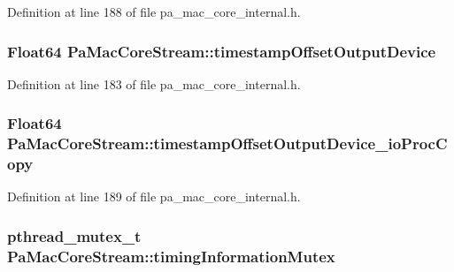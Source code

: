 Definition at line 188 of file pa\+\_\+mac\+\_\+core\+\_\+internal.\+h.

\subsubsection[{\texorpdfstring{timestamp\+Offset\+Output\+Device}{timestampOffsetOutputDevice}}]{\setlength{\rightskip}{0pt plus 5cm}Float64 Pa\+Mac\+Core\+Stream\+::timestamp\+Offset\+Output\+Device}\hypertarget{struct_pa_mac_core_stream_a81525a1ff3c1cb96a57d44c5ca70f7c4}{}\label{struct_pa_mac_core_stream_a81525a1ff3c1cb96a57d44c5ca70f7c4}


Definition at line 183 of file pa\+\_\+mac\+\_\+core\+\_\+internal.\+h.

\subsubsection[{\texorpdfstring{timestamp\+Offset\+Output\+Device\+\_\+io\+Proc\+Copy}{timestampOffsetOutputDevice_ioProcCopy}}]{\setlength{\rightskip}{0pt plus 5cm}Float64 Pa\+Mac\+Core\+Stream\+::timestamp\+Offset\+Output\+Device\+\_\+io\+Proc\+Copy}\hypertarget{struct_pa_mac_core_stream_a4eb660a54787d8965d59a774b21ab454}{}\label{struct_pa_mac_core_stream_a4eb660a54787d8965d59a774b21ab454}


Definition at line 189 of file pa\+\_\+mac\+\_\+core\+\_\+internal.\+h.

\subsubsection[{\texorpdfstring{timing\+Information\+Mutex}{timingInformationMutex}}]{\setlength{\rightskip}{0pt plus 5cm}pthread\+\_\+mutex\+\_\+t Pa\+Mac\+Core\+Stream\+::timing\+Information\+Mutex}\hypertarget{struct_pa_mac_core_stream_ab03af1e2679f505b0ab8ad629a0b4a34}{}\label{struct_pa_mac_core_stream_ab03af1e2679f505b0ab8ad629a0b4a34}


